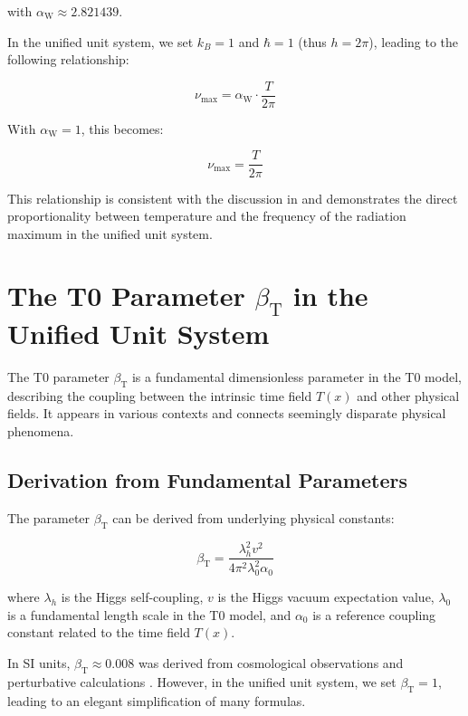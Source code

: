 \documentclass[12pt,a4paper]{article}
\newcommand{\Tfield}{T(x)}
\newcommand{\betaT}{\beta_{\text{T}}}
\newcommand{\alphaW}{\alpha_{\text{W}}}
\begin{document}
	with \(\alphaW \approx 2.821439\).
	
	In the unified unit system, we set \(k_B = 1\) and \(\hbar = 1\) (thus \(h = 2\pi\)), leading to the following relationship:
	
	\begin{equation}
		\nu_{\text{max}} = \alphaW \cdot \frac{T}{2\pi}
	\end{equation}
	
	With \(\alphaW = 1\), this becomes:
	
	\begin{equation}
		\nu_{\text{max}} = \frac{T}{2\pi}
	\end{equation}
	
	This relationship is consistent with the discussion in \cite{pascher_temp_2025} and demonstrates the direct proportionality between temperature and the frequency of the radiation maximum in the unified unit system.
	
	\section{The T0 Parameter \(\betaT\) in the Unified Unit System}
	
	The T0 parameter \(\betaT\) is a fundamental dimensionless parameter in the T0 model, describing the coupling between the intrinsic time field \(\Tfield\) and other physical fields. It appears in various contexts and connects seemingly disparate physical phenomena.
	
	\subsection{Derivation from Fundamental Parameters}
	
	The parameter \(\betaT\) can be derived from underlying physical constants:
	
	\begin{equation}
		\betaT = \frac{\lambda_h^2 v^2}{4\pi^2 \lambda_0^2 \alpha_0}
	\end{equation}
	
	where \(\lambda_h\) is the Higgs self-coupling, \(v\) is the Higgs vacuum expectation value, \(\lambda_0\) is a fundamental length scale in the T0 model, and \(\alpha_0\) is a reference coupling constant related to the time field \(\Tfield\).
	
	In SI units, \(\betaT \approx 0.008\) was derived from cosmological observations and perturbative calculations \cite{pascher_params_2025}. However, in the unified unit system, we set \(\betaT = 1\), leading to an elegant simplification of many formulas.
	
\end{document}
